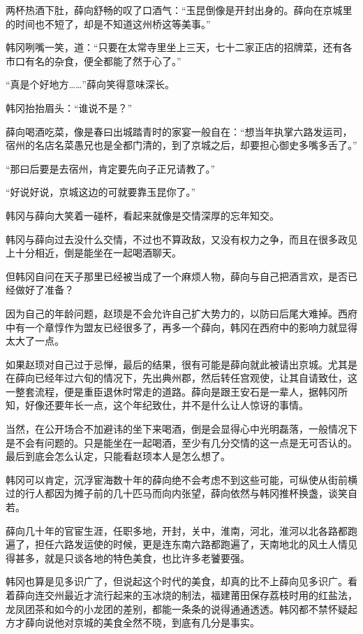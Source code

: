 两杯热酒下肚，薛向舒畅的叹了口酒气：“玉昆倒像是开封出身的。薛向在京城里的时间也不短了，却是不知道这州桥这等美事。”

韩冈咧嘴一笑，道：“只要在太常寺里坐上三天，七十二家正店的招牌菜，还有各市口有名的杂食，便全都能了然于心了。”

“真是个好地方……”薛向笑得意味深长。

韩冈抬抬眉头：“谁说不是？”

薛向喝酒吃菜，像是春曰出城踏青时的家宴一般自在：“想当年执掌六路发运司，宿州的名店名菜愚兄也是全都门清的，到了京城之后，却要担心御史多嘴多舌了。”

“那曰后要是去宿州，肯定要先向子正兄请教了。”

“好说好说，京城这边的可就要靠玉昆你了。”

韩冈与薛向大笑着一碰杯，看起来就像是交情深厚的忘年知交。

韩冈与薛向过去没什么交情，不过也不算政敌，又没有权力之争，而且在很多政见上十分相近，倒是能坐在一起喝酒聊天。

但韩冈自问在天子那里已经被当成了一个麻烦人物，薛向与自己把酒言欢，是否已经做好了准备？

因为自己的年龄问题，赵顼是不会允许自己扩大势力的，以防曰后尾大难掉。西府中有一个章惇作为盟友已经很多了，再多一个薛向，韩冈在西府中的影响力就显得太大了一点。

如果赵顼对自己过于忌惮，最后的结果，很有可能是薛向就此被请出京城。尤其是在薛向已经年过六旬的情况下，先出典州郡，然后转任宫观使，让其自请致仕，这一整套流程，便是重臣退休时常走的道路。薛向是跟王安石是一辈人，据韩冈所知，好像还要年长一点，这个年纪致仕，并不是什么让人惊讶的事情。

当然，在公开场合不加避讳的坐下来喝酒，倒是会显得心中光明磊落，一般情况下是不会有问题的。只是能坐在一起喝酒，至少有几分交情的这一点是无可否认的。最后到底会怎么认定，只能看赵顼本人是怎么想了。

韩冈可以肯定，沉浮宦海数十年的薛向绝不会考虑不到这些可能，可纵使从街前横过的行人都因为摊子前的几十匹马而向内张望，薛向依然与韩冈推杯换盏，谈笑自若。

薛向几十年的官宦生涯，任职多地，开封，关中，淮南，河北，淮河以北各路都跑遍了，担任六路发运使的时候，更是连东南六路都跑遍了，天南地北的风土人情见得甚多，就是只谈各地的特色美食，也比许多老饕要强。

韩冈也算是见多识广了，但说起这个时代的美食，却真的比不上薛向见多识广。看着薛向连交州最近才流行起来的玉冰烧的制法，福建莆田保存荔枝时用的红盐法，龙凤团茶和如今的小龙团的差别，都能一条条的说得通通透透。韩冈都不禁怀疑起方才薛向说他对京城的美食全然不晓，到底有几分是事实。

